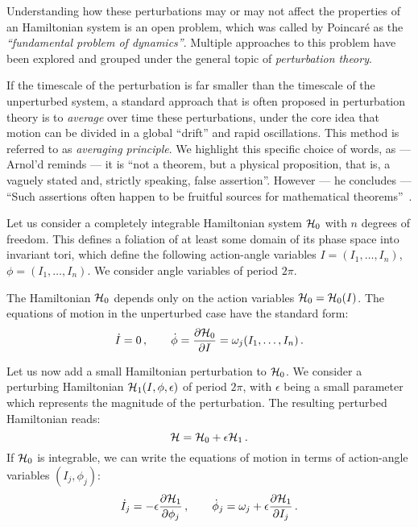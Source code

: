 Understanding how these perturbations may or may not affect the properties of an Hamiltonian system is an open problem, which was called by Poincaré as the \textit{``fundamental problem of dynamics''}. Multiple approaches to this problem have been explored and grouped under the general topic of \textit{perturbation theory}.

If the timescale of the perturbation is far smaller than the timescale of the unperturbed system, a standard approach that is often proposed in perturbation theory is to \textit{average} over time these perturbations, under the core idea that motion can be divided in a global ``drift'' and rapid oscillations. This method is referred to as \textit{averaging principle}. We highlight this specific choice of words, as --- Arnol'd reminds --- it is ``not a theorem, but a physical proposition, that is, a vaguely stated and, strictly speaking, false assertion''. However --- he concludes --- ``Such assertions often happen to be fruitful sources for mathematical theorems''~\cite{Arnold:937549}.

Let us consider a completely integrable Hamiltonian system $\mathcal{H}_0$ with $n$ degrees of freedom. This defines a foliation of at least some domain of its phase space into invariant tori, which define the following action-angle variables $I=(I_1, \ldots, I_n)$, $\phi=(I_1, \ldots, I_n)$. We consider angle variables of period $2\pi$.

The Hamiltonian $\mathcal{H}_0$ depends only on the action variables $\mathcal{H}_0=\mathcal{H}_0(I)$. The equations of motion in the unperturbed case have the standard form:
\begin{equation}
    \dot{I}=0\,, \qquad \dot{\phi} = \pdv{\mathcal{H}_0}{I} = \omega_j(I_1,\dots,I_n) \,.
\end{equation}

Let us now add a small Hamiltonian perturbation to $\mathcal{H}_0$. We consider a perturbing Hamiltonian $\mathcal{H}_1(I, \phi, \epsilon)$ of period $2\pi$, with $\epsilon$ being a small parameter which represents the magnitude of the perturbation. The resulting perturbed Hamiltonian reads:
\begin{equation}
    \mathcal{H} = \mathcal{H}_0 + \epsilon \mathcal{H}_1\,.
\end{equation}
%
If $\mathcal{H}_0$ is integrable, we can write the equations of motion in terms of action-angle variables $(I_j,\phi_j)$:
%
\begin{equation}
    \dot I_j = -\epsilon \pdv{\mathcal{H}_1}{\phi_j}\,,\qquad
	\dot \phi_j = \omega_j + \epsilon \pdv{\mathcal{H}_1}{I_j}\, .
\end{equation}
%

